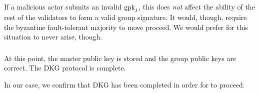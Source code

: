 If a malicious actor submits an invalid $\textrm{gpk}_{j}$,
this does \emph{not} affect the ability of the rest of the validators
to form a valid group signature.
It would, though, require the byzantine fault-tolerant majority
to move proceed.
We would prefer for this situation to never arise, though.



\subsubsection{\Completion{}}
\label{sssec:gpkj_complete}
At this point, the master public key is stored
and the group public keys are correct.
The DKG protocol is complete.

In our case, we confirm that DKG has been completed in order
for \LayerTwo{} to proceed.

